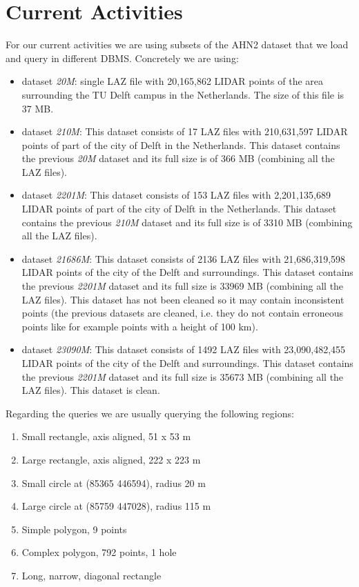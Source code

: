 \documentclass[a4paper,11pt]{article}
\begin{document}
\section{Current Activities}

For our current activities we are using subsets of the AHN2 dataset that we load and query in different DBMS. Concretely we are using:

\begin{itemize}
	\item dataset \textit{20M}: single LAZ file with 20,165,862 LIDAR points of the area surrounding the TU Delft campus in the Netherlands. The size of this file is 37 MB.
	\item dataset \textit{210M}: This dataset consists of 17 LAZ files with 210,631,597 LIDAR points of part of the city of Delft in the Netherlands. This dataset contains the previous \textit{20M} dataset and its full size is of 366 MB (combining all the LAZ files).
	\item dataset \textit{2201M}: This dataset consists of 153 LAZ files with 2,201,135,689 LIDAR points of part of the city of Delft in the Netherlands. This dataset contains the previous \textit{210M} dataset and its full size is of 3310 MB (combining all the LAZ files).
	\item dataset \textit{21686M}: This dataset consists of 2136 LAZ files with 21,686,319,598 LIDAR points of the city of the Delft and surroundings. This dataset contains the previous \textit{2201M} dataset and its full size is 33969 MB (combining all the LAZ files). This dataset has not been cleaned so it may contain inconsistent points (the previous datasets are cleaned, i.e. they do not contain erroneous points like for example points with a height of 100 km).
	\item dataset \textit{23090M}: This dataset consists of 1492 LAZ files with 23,090,482,455 LIDAR points of the city of the Delft and surroundings. This dataset contains the previous \textit{2201M} dataset and its full size is 35673 MB (combining all the LAZ files). This dataset is clean.
\end{itemize}

Regarding the queries we are usually querying the following regions:

\begin{enumerate}
	\item Small rectangle, axis aligned, 51 x 53 m
	\item Large rectangle, axis aligned, 222 x 223 m
	\item Small circle at (85365 446594), radius 20 m
	\item Large circle at (85759 447028), radius 115 m
	\item Simple polygon, 9 points
	\item Complex polygon, 792 points, 1 hole
	\item Long, narrow, diagonal rectangle
\end{enumerate}
\end{document}
